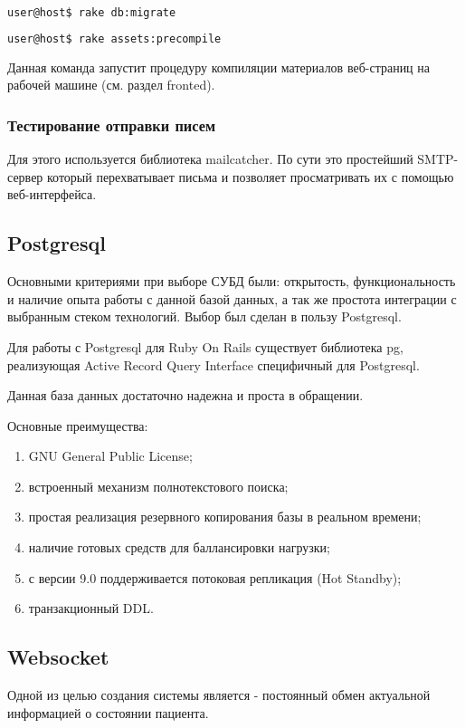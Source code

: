 \begin{lstlisting}[language=Bash,caption=Выполнение миграций
,label={lst:rails_new_application}] 
user@host$ rake db:migrate
\end{lstlisting}

\begin{lstlisting}[language=Bash,caption=Компиляция ресурсов
,label={lst:rails_new_application}] 
user@host$ rake assets:precompile
\end{lstlisting}
 
 Данная команда запустит процедуру компиляции материалов веб-страниц на рабочей
 машине (см. раздел fronted).
 
 \subsubsection{Тестирование отправки писем}
 Для этого используется библиотека mailcatcher. По сути это простейший
 SMTP-сервер который перехватывает письма и позволяет просматривать их с помощью
 веб-интерфейса.
 
 \subsection{Postgresql}
Основными критериями при выборе СУБД были: открытость, функциональность и
наличие опыта работы с данной базой данных, а так же простота интеграции с
выбранным стеком технологий. Выбор был сделан в пользу Postgresql.

Для работы с Postgresql для Ruby On Rails существует библиотека pg, реализующая
Active Record Query Interface специфичный для Postgresql.

Данная база данных достаточно надежна и проста в обращении.

Основные преимущества:
\begin{enumerate}
  \item GNU General Public License;
  \item встроенный механизм полнотекстового поиска;
  \item простая реализация резервного копирования базы в реальном времени;
  \item наличие готовых средств для баллансировки нагрузки;
  \item с версии 9.0 поддерживается потоковая репликация (Hot Standby);
  \item транзакционный DDL.
\end{enumerate}

\subsection{Websocket}
Одной из целью создания системы является - постоянный обмен актуальной
информацией о состоянии пациента.
	
